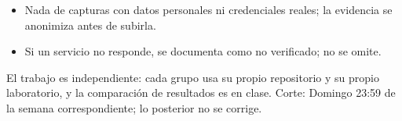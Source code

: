 \documentclass[11pt,a4paper]{article}
\begin{document}
\begin{itemize}[leftmargin=1.4em,itemsep=2pt,topsep=3pt]
  \item Nada de capturas con datos personales ni credenciales reales; la evidencia se anonimiza antes de subirla.
  \item Si un servicio no responde, se documenta como no verificado; no se omite.
\end{itemize}

\begin{cajaRecuerda}El trabajo es independiente: cada grupo usa su propio repositorio y su propio laboratorio, y la comparación de resultados es en clase. Corte: Domingo 23:59 de la semana correspondiente; lo posterior no se corrige.
\end{cajaRecuerda}
\end{document}
